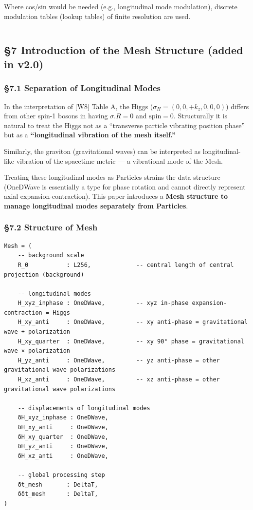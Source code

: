 \documentclass[a4paper,11pt]{article}
\begin{document}
Where cos/sin would be needed (e.g., longitudinal mode modulation),
discrete modulation tables (lookup tables) of finite resolution are
used.

\begin{center}\rule{0.5\linewidth}{0.5pt}\end{center}

\subsection{§7 Introduction of the Mesh Structure (added in
v2.0)}\label{introduction-of-the-mesh-structure-added-in-v2.0}

\subsubsection{§7.1 Separation of Longitudinal
Modes}\label{separation-of-longitudinal-modes}

In the interpretation of {[}W8{]} Table A, the Higgs
(\(\sigma_H = (0, 0, +k_z, 0, 0, 0)\)) differs from other spin-1 bosons
in having \(\sigma.R = 0\) and \(\text{spin} = 0\). Structurally it is
natural to treat the Higgs not as a ``transverse particle vibrating
position phase'' but as a \textbf{``longitudinal vibration of the mesh
itself.''}

Similarly, the graviton (gravitational waves) can be interpreted as
longitudinal-like vibration of the spacetime metric --- a vibrational
mode of the Mesh.

Treating these longitudinal modes as Particles strains the data
structure (OneDWave is essentially a type for phase rotation and cannot
directly represent axial expansion-contraction). This paper introduces a
\textbf{Mesh structure to manage longitudinal modes separately from
Particles}.

\subsubsection{§7.2 Structure of Mesh}\label{structure-of-mesh}

\begin{verbatim}
Mesh = (
    -- background scale
    R_0           : L256,             -- central length of central projection (background)
    
    -- longitudinal modes
    H_xyz_inphase : OneDWave,         -- xyz in-phase expansion-contraction = Higgs
    H_xy_anti     : OneDWave,         -- xy anti-phase = gravitational wave + polarization
    H_xy_quarter  : OneDWave,         -- xy 90° phase = gravitational wave × polarization
    H_yz_anti     : OneDWave,         -- yz anti-phase = other gravitational wave polarizations
    H_xz_anti     : OneDWave,         -- xz anti-phase = other gravitational wave polarizations
    
    -- displacements of longitudinal modes
    δH_xyz_inphase : OneDWave,
    δH_xy_anti     : OneDWave,
    δH_xy_quarter  : OneDWave,
    δH_yz_anti     : OneDWave,
    δH_xz_anti     : OneDWave,
    
    -- global processing step
    δt_mesh       : DeltaT,
    δδt_mesh      : DeltaT,
)
\end{verbatim}
\end{document}
